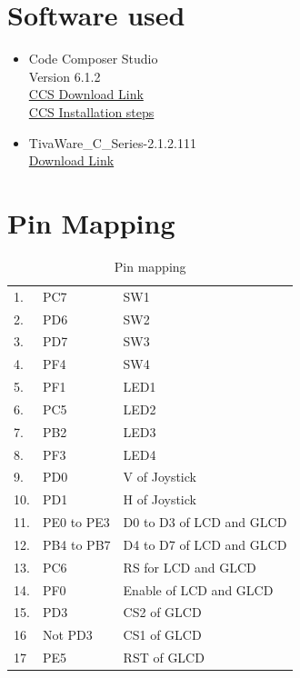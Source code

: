 \documentclass[a4paper,12pt,oneside]{book}
\begin{document}

\section{Software used}
\begin{itemize}
  \item Code Composer Studio\\  
  Version 6.1.2 \\
  \href{http://processors.wiki.ti.com/index.php/Download_CCS}{CCS Download Link}\\
  \href{http://processors.wiki.ti.com/index.php/GSG:CCSv6_installation}{CCS Installation steps}
  \item TivaWare\_C\_Series-2.1.2.111\\
  \href{http://www.ti.com/tool/sw-tm4c}{Download Link}
\end{itemize}
\newpage
\section{Pin Mapping}

\begin{table}[]
\centering
\begin{tabular}{lll}
1.  & PC7        & SW1                      \\
2.  & PD6        & SW2                      \\
3.  & PD7        & SW3                      \\
4.  & PF4        & SW4                      \\
5.  & PF1        & LED1                     \\
6.  & PC5        & LED2                     \\
7.  & PB2        & LED3                     \\
8.  & PF3        & LED4                     \\
9.  & PD0        & V of Joystick            \\
10. & PD1        & H of Joystick            \\
11. & PE0 to PE3 & D0 to D3 of LCD and GLCD \\
12. & PB4 to PB7 & D4 to D7 of LCD and GLCD \\
13. & PC6        & RS for LCD and GLCD      \\
14. & PF0        & Enable of LCD and GLCD   \\
15. & PD3        & CS2 of  GLCD             \\
16  & Not PD3    & CS1 of GLCD              \\
17  & PE5        & RST of GLCD             
\end{tabular}
\caption{Pin mapping}
\end{table}
\end{document}
